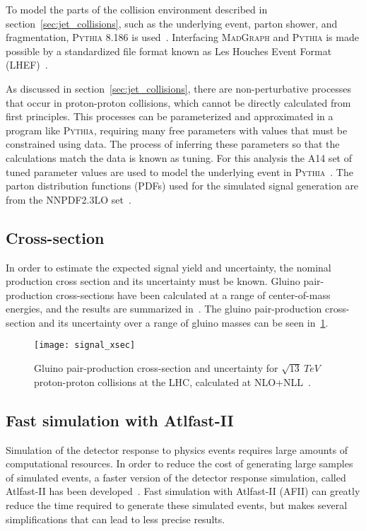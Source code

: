 To model the parts of the collision environment described in section~\ref{sec:jet_collisions}, such as the underlying event, parton shower, and fragmentation, \textsc{Pythia} 8.186 is used~\cite{signal-pythia}.
Interfacing \textsc{MadGraph} and \textsc{Pythia} is made possible by a standardized file format known as Les Houches Event Format (LHEF)~\cite{signal-lhef}.

As discussed in section~\ref{sec:jet_collisions}, there are non-perturbative processes that occur in proton-proton collisions, which cannot be directly calculated from first principles.
This processes can be parameterized and approximated in a program like \textsc{Pythia}, requiring many free parameters with values that must be constrained using data.
The process of inferring these parameters so that the calculations match the data is known as tuning.
For this analysis the A14 set of tuned parameter values are used to model the underlying event in \textsc{Pythia}~\cite{signal-pythia-a14,signal-pythia-tunes}.
The parton distribution functions (PDFs) used for the simulated signal generation are from the NNPDF2.3LO set~\cite{signal-nnpdf}.

\subsection{Cross-section}\label{subsec:signal_cross_section}
In order to estimate the expected signal yield and uncertainty, the nominal production cross section and its uncertainty must be known.
Gluino pair-production cross-sections have been calculated at a range of center-of-mass energies, and the results are summarized in~\cite{signal-xsec}.
The gluino pair-production cross-section and its uncertainty over a range of gluino masses can be seen in~\ref{fig:signal_xsec}.

\begin{figure}[!ht]\centering
    \texttt{[image: signal\_xsec]}
    \caption{Gluino pair-production cross-section and uncertainty for $\sqrt{13}~TeV$ proton-proton collisions at the LHC, calculated at NLO+NLL~\cite{signal-xsec}.}
    \label{fig:signal_xsec}
\end{figure}

\subsection{Fast simulation with Atlfast-II}\label{subsec:fastsim}

Simulation of the detector response to physics events requires large amounts of computational resources.
In order to reduce the cost of generating large samples of simulated events, a faster version of the detector response simulation, called Atlfast-II has been developed~\cite{mc-atlfast}.
Fast simulation with Atlfast-II (AFII) can greatly reduce the time required to generate these simulated events, but makes several simplifications that can lead to less precise results.

